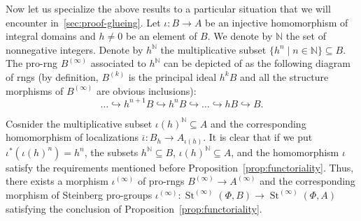 \documentclass[oneside, 11pt]{amsart} \pdfoutput=1
\newcommand{\St}{\mathop{\mathrm{St}}\nolimits}
\numberwithin{equation}{section}
\theoremstyle{definition}
\begin{document}
Now let us specialize the above results to a particular situation that we will encounter in~\cref{sec:proof-glueing}.
Let $\iota \colon B \to A$ be an injective homomorphism of integral domains and $h \neq 0$ be an element of $B$.
We denote by $\mathbb N$ the set of nonnegative integers. Denote by $h^{\mathbb{N}}$ the multiplicative subset $\{ h^n \mid n \in \mathbb{N} \} \subseteq B$. The pro-rng $B^{(\infty)}$ associated to $h^\mathbb{N}$ can be depicted of as the following diagram of rngs (by definition, $B^{(k)}$ is the principal ideal $h^kB$ and all the structure morphisms of $B^{(\infty)}$ are obvious inclusions):
\[ \ldots \hookrightarrow h^{n+1} B \hookrightarrow h^n B \hookrightarrow \ldots \hookrightarrow hB \hookrightarrow B. \]
 
Cosnider the multiplicative subset $\iota(h)^\mathbb{N} \subseteq A$ and the corresponding homomorphism of localizations $\overline{\iota} \colon B_h \to A_{\iota(h)}$. It is clear that if we put $\iota^*(\iota(h)^n) = h^n$, the subsets $h^\mathbb{N} \subseteq B$, $\iota(h)^\mathbb{N} \subseteq A$, and the homomorphism $\iota$ satisfy the requirements mentioned before Proposition~\ref{prop:functoriality}. Thus, there exists a morphism $\iota^{(\infty)}$ of pro-rngs $B^{(\infty)} \to A^{(\infty)}$ and the corresponding morphism of Steinberg pro-groups $\iota^{(\infty)}\colon\St^{(\infty)}(\Phi, B) \to \St^{(\infty)}(\Phi, A)$ satisfying the conclusion of Proposition~\ref{prop:functoriality}.
\end{document}
